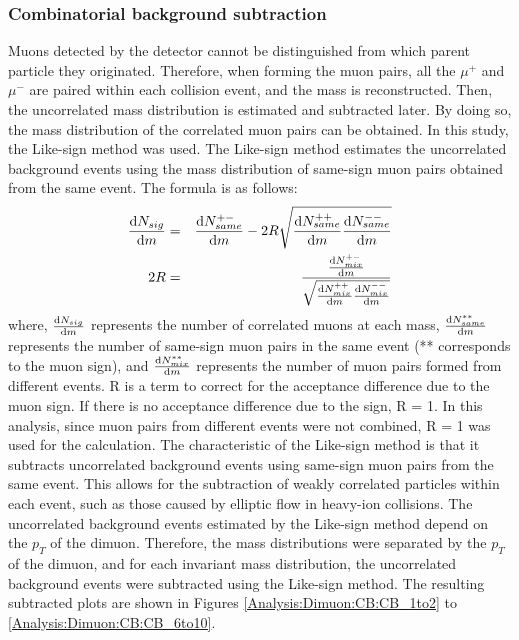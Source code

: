             \subsubsection{Combinatorial background subtraction}
            \label{Analysis:Dimuon:Combinatorial BG subtraction}
                Muons detected by the detector cannot be distinguished from which parent particle they originated. Therefore, when forming the muon pairs, all the $\mu^+$ and $\mu^-$ are paired within each collision event, and the mass is reconstructed. Then, the uncorrelated mass distribution is estimated and subtracted later. By doing so, the mass distribution of the correlated muon pairs can be obtained.
                In this study, the Like-sign method was used. The Like-sign method estimates the uncorrelated background events using the mass distribution of same-sign muon pairs obtained from the same event. The formula is as follows:
                \begin{eqnarray}
                    \dv{N_{sig}}{m} &=& \dv{N_{same}^{+-}}{m} - 2R \sqrt{\dv{N_{same}^{++}}{m} \dv{N_{same}^{--}}{m}}\\
                    2R &=& \frac{\dv{N_{mix}^{+-}}{m}}{\sqrt{\dv{N_{mix}^{++}}{m} \dv{N_{mix}^{--}}{m}}} 
                \end{eqnarray}
                where, $\dv{N_{sig}}{m}$ represents the number of correlated muons at each mass, $\dv{N_{same}^{**}}{m}$ represents the number of same-sign muon pairs in the same event (** corresponds to the muon sign), and $\dv{N_{mix}^{**}}{m}$ represents the number of muon pairs formed from different events. R is a term to correct for the acceptance difference due to the muon sign. If there is no acceptance difference due to the sign, R = 1. In this analysis, since muon pairs from different events were not combined, R = 1 was used for the calculation.
                The characteristic of the Like-sign method is that it subtracts uncorrelated background events using same-sign muon pairs from the same event. This allows for the subtraction of weakly correlated particles within each event, such as those caused by elliptic flow in heavy-ion collisions. The uncorrelated background events estimated by the Like-sign method depend on the $p_T$ of the dimuon. Therefore, the mass distributions were separated by the $p_T$ of the dimuon, and for each invariant mass distribution, the uncorrelated background events were subtracted using the Like-sign method. The resulting subtracted plots are shown in Figures \ref{Analysis:Dimuon:CB:CB_1to2} to \ref{Analysis:Dimuon:CB:CB_6to10}.
